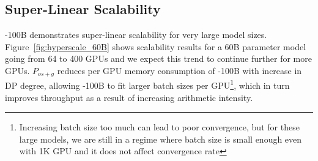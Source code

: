 \subsection{Super-Linear Scalability}
\name-100B demonstrates super-linear scalability for very large model sizes. Figure~\ref{fig:hyperscale_60B} shows scalability results for a 60B parameter model going from 64 to 400 GPUs and we expect this trend to continue further for more GPUs. $P_{os+g}$ reduces per GPU memory consumption of \name-100B with increase in DP degree, allowing \name-100B to fit larger batch sizes per GPU\footnote{Increasing batch size too much can lead to poor convergence, but for these large models, we are still in a regime where batch size is small enough even with 1K GPU and it does not affect convergence rate}, which in turn improves throughput as a result of increasing arithmetic intensity. 



